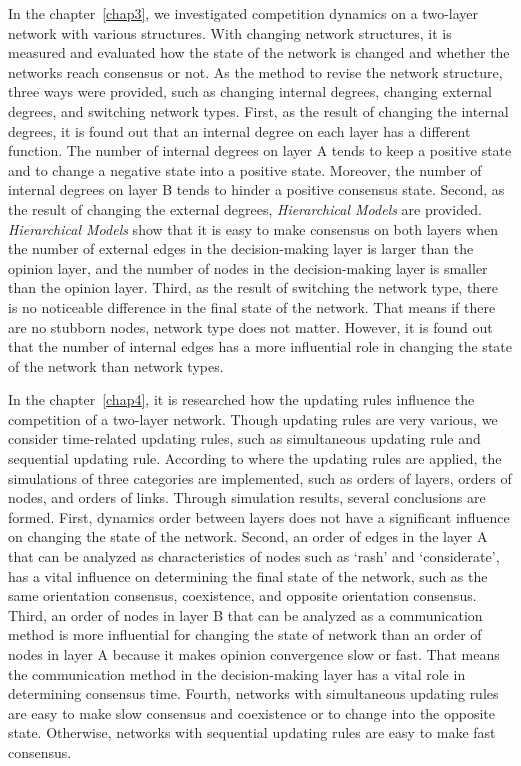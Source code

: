 In the chapter~\ref{chap3}, we investigated competition dynamics on a two-layer network with various structures. With changing network structures, it is measured and evaluated how the state of the network is changed and whether the networks reach consensus or not. As the method to revise the network structure, three ways were provided, such as changing internal degrees, changing external degrees, and switching network types. First, as the result of changing the internal degrees, it is found out that an internal degree on each layer has a different function. The number of internal degrees on layer A tends to keep a positive state and to change a negative state into a positive state. Moreover, the number of internal degrees on layer B tends to hinder a positive consensus state. Second, as the result of changing the external degrees, \textit{Hierarchical Models} are provided. \textit{Hierarchical Models} show that it is easy to make consensus on both layers when the number of external edges in the decision-making layer is larger than the opinion layer, and the number of nodes in the decision-making layer is smaller than the opinion layer. Third, as the result of switching the network type, there is no noticeable difference in the final state of the network. That means if there are no stubborn nodes, network type does not matter. However, it is found out that the number of internal edges has a more influential role in changing the state of the network than network types.

In the chapter~\ref{chap4}, it is researched how the updating rules influence the competition of a two-layer network. Though updating rules are very various, we consider time-related updating rules, such as simultaneous updating rule and sequential updating rule. According to where the updating rules are applied, the simulations of three categories are implemented, such as orders of layers, orders of nodes, and orders of links. Through simulation results, several conclusions are formed. First, dynamics order between layers does not have a significant influence on changing the state of the network. Second, an order of edges in the layer A that can be analyzed as characteristics of nodes such as `rash' and `considerate', has a vital influence on determining the final state of the network, such as the same orientation consensus, coexistence, and opposite orientation consensus. Third, an order of nodes in layer B that can be analyzed as a communication method is more influential for changing the state of network than an order of nodes in layer A because it makes opinion convergence slow or fast. That means the communication method in the decision-making layer has a vital role in determining consensus time. Fourth, networks with simultaneous updating rules are easy to make slow consensus and coexistence or to change into the opposite state. Otherwise, networks with sequential updating rules are easy to make fast consensus.


